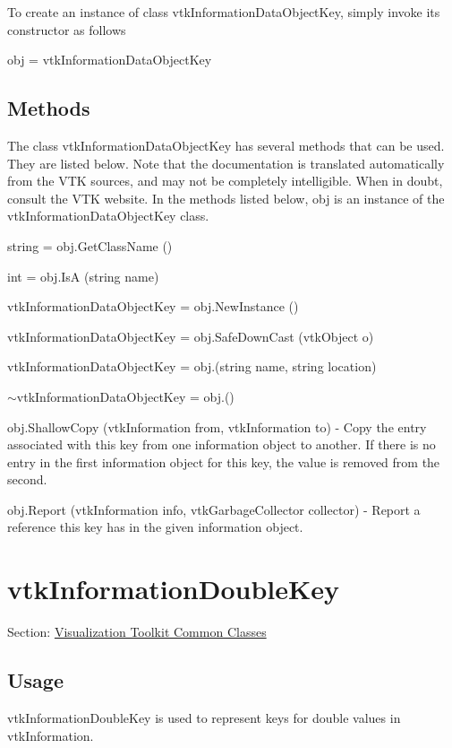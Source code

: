 To create an instance of class vtk\-Information\-Data\-Object\-Key, simply invoke its constructor as follows \begin{DoxyVerb}  obj = vtkInformationDataObjectKey
\end{DoxyVerb}
 \hypertarget{vtkwidgets_vtkxyplotwidget_Methods}{}\subsection{Methods}\label{vtkwidgets_vtkxyplotwidget_Methods}
The class vtk\-Information\-Data\-Object\-Key has several methods that can be used. They are listed below. Note that the documentation is translated automatically from the V\-T\-K sources, and may not be completely intelligible. When in doubt, consult the V\-T\-K website. In the methods listed below, {\ttfamily obj} is an instance of the vtk\-Information\-Data\-Object\-Key class. 
\begin{DoxyItemize}
\item {\ttfamily string = obj.\-Get\-Class\-Name ()}  
\item {\ttfamily int = obj.\-Is\-A (string name)}  
\item {\ttfamily vtk\-Information\-Data\-Object\-Key = obj.\-New\-Instance ()}  
\item {\ttfamily vtk\-Information\-Data\-Object\-Key = obj.\-Safe\-Down\-Cast (vtk\-Object o)}  
\item {\ttfamily vtk\-Information\-Data\-Object\-Key = obj.(string name, string location)}  
\item {\ttfamily $\sim$vtk\-Information\-Data\-Object\-Key = obj.()}  
\item {\ttfamily obj.\-Shallow\-Copy (vtk\-Information from, vtk\-Information to)} -\/ Copy the entry associated with this key from one information object to another. If there is no entry in the first information object for this key, the value is removed from the second.  
\item {\ttfamily obj.\-Report (vtk\-Information info, vtk\-Garbage\-Collector collector)} -\/ Report a reference this key has in the given information object.  
\end{DoxyItemize}\hypertarget{vtkcommon_vtkinformationdoublekey}{}\section{vtk\-Information\-Double\-Key}\label{vtkcommon_vtkinformationdoublekey}
Section\-: \hyperlink{sec_vtkcommon}{Visualization Toolkit Common Classes} \hypertarget{vtkwidgets_vtkxyplotwidget_Usage}{}\subsection{Usage}\label{vtkwidgets_vtkxyplotwidget_Usage}
vtk\-Information\-Double\-Key is used to represent keys for double values in vtk\-Information.

